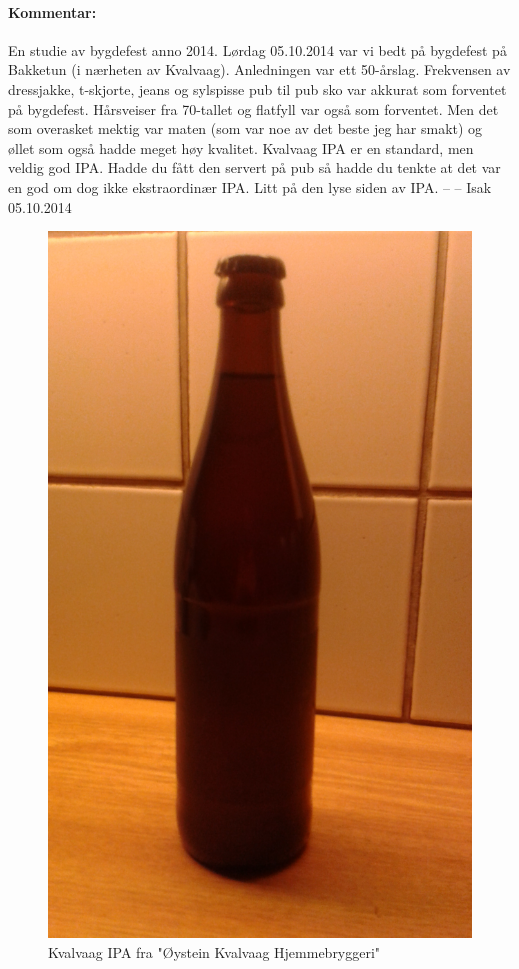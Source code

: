 \documentclass[12pt,a4paper,oneside,norsk]{article}
\begin{document}
\paragraph{Kommentar:} En studie av bygdefest anno 2014. Lørdag 05.10.2014 var vi bedt på bygdefest på Bakketun (i nærheten av Kvalvaag). Anledningen var ett 50-årslag. Frekvensen av dressjakke, t-skjorte, jeans og sylspisse pub til pub sko var akkurat som forventet på bygdefest. Hårsveiser fra 70-tallet og flatfyll var også som forventet. Men det som overasket mektig var maten (som var noe av det beste jeg har smakt) og øllet som også hadde meget høy kvalitet. Kvalvaag IPA er en standard, men veldig god IPA. Hadde du fått den servert på pub så hadde du tenkte at det var en god om dog ikke ekstraordinær IPA. Litt på den lyse siden av IPA.
-- -- Isak 05.10.2014

\begin{figure} [H]
\centering
\includegraphics[scale=0.1, angle=270]{Bilder/Ol/KvalvaagIPA}
\caption{Kvalvaag IPA fra "Øystein Kvalvaag Hjemmebryggeri"}
\end{figure}
\end{document}
